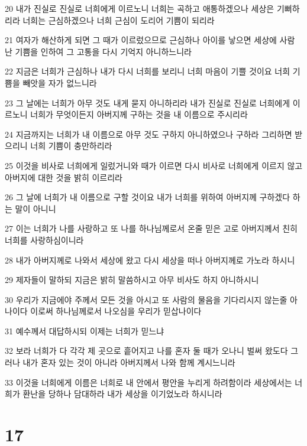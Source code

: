 \par 20 내가 진실로 진실로 너희에게 이르노니 너희는 곡하고 애통하겠으나 세상은 기뻐하리라 너희는 근심하겠으나 너희 근심이 도리어 기쁨이 되리라
\par 21 여자가 해산하게 되면 그 때가 이르렀으므로 근심하나 아이를 낳으면 세상에 사람 난 기쁨을 인하여 그 고통을 다시 기억지 아니하느니라
\par 22 지금은 너희가 근심하나 내가 다시 너희를 보리니 너희 마음이 기쁠 것이요 너희 기쁨을 빼앗을 자가 없느니라
\par 23 그 날에는 너희가 아무 것도 내게 묻지 아니하리라 내가 진실로 진실로 너희에게 이르노니 너희가 무엇이든지 아버지께 구하는 것을 내 이름으로 주시리라
\par 24 지금까지는 너희가 내 이름으로 아무 것도 구하지 아니하였으나 구하라 그리하면 받으리니 너희 기쁨이 충만하리라
\par 25 이것을 비사로 너희에게 일렀거니와 때가 이르면 다시 비사로 너희에게 이르지 않고 아버지에 대한 것을 밝히 이르리라
\par 26 그 날에 너희가 내 이름으로 구할 것이요 내가 너희를 위하여 아버지께 구하겠다 하는 말이 아니니
\par 27 이는 너희가 나를 사랑하고 또 나를 하나님께로서 온줄 믿은 고로 아버지께서 친히 너희를 사랑하심이니라
\par 28 내가 아버지께로 나와서 세상에 왔고 다시 세상을 떠나 아버지께로 가노라 하시니
\par 29 제자들이 말하되 지금은 밝히 말씀하시고 아무 비사도 하지 아니하시니
\par 30 우리가 지금에야 주께서 모든 것을 아시고 또 사람의 물음을 기다리시지 않는줄 아나이다 이로써 하나님께로서 나오심을 우리가 믿삽나이다
\par 31 예수께서 대답하시되 이제는 너희가 믿느냐
\par 32 보라 너희가 다 각각 제 곳으로 흩어지고 나를 혼자 둘 때가 오나니 벌써 왔도다 그러나 내가 혼자 있는 것이 아니라 아버지께서 나와 함께 계시느니라
\par 33 이것을 너희에게 이름은 너희로 내 안에서 평안을 누리게 하려함이라 세상에서는 너희가 환난을 당하나 담대하라 내가 세상을 이기었노라 하시니라

\chapter{17}

